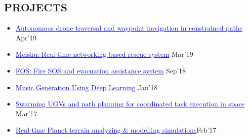 \documentclass[11pt]{res} %
\newcommand{\sectgap}{0.05in} %
\begin{document}
\begin{resume}
\section{PROJECTS}
\vspace{0.25in}
\begin{itemize}
    \item
    \href{https://github.com/chetanchawla/eYantra2018-HB}{\textcolor{blue}{Autonomous drone traversal and waypoint navigation in constrained paths}} \hfill Apr'19
    \item
    \href{https://github.com/chetanchawla/Future-Gadget-Labs-HINT}{\textcolor{blue}{Meishu: Real-time networking based rescue system}} \hfill Mar'19
    \item
    \href{https://github.com/Future-Gadgets-Lab/FOS-Fire-SOS-System}{\textcolor{blue}{FOS: Fire SOS and evacuation assistance system}} \hfill Sep'18
    \item
    \href{https://github.com/chetanchawla/Deep-Learning-for-Music-Generation}{\textcolor{blue}{Music Generation Using Deep Learning}} \hfill Jan'18
    \item
    \href{https://github.com/chetanchawla/eYantra-2016-Bothoven}{\textcolor{blue}{Swarming UGVs and path planning for coordinated task execution in space}} \hfill Mar'17
    \item
    \href{https://github.com/chetanchawla/Blender-Models}{\textcolor{blue}{Real-time Planet terrain analyzing \& modelling simulations}}\hfill Feb'17
\end{itemize}
\vspace{\sectgap} 
\hline


\end{resume}
\end{document}
